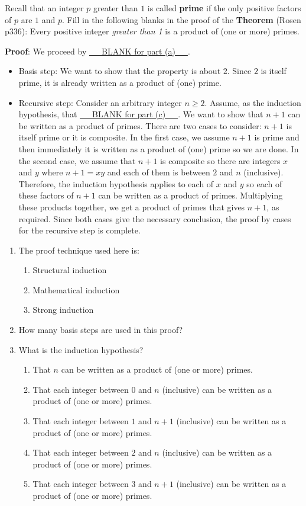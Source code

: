 
Recall that an integer $p$ greater than $1$ is called {\bf prime} if the only positive factors of 
$p$ are $1$ and $p$. Fill in the following blanks in the proof of the {\bf Theorem} (Rosen p336): 
Every positive integer {\it greater than 1} is a product of (one or more) primes.

{\bf Proof}: We proceed by \underline{~~~BLANK for part (a)~~~}.
\begin{itemize}
\item[] Basis step: We want to show that the property is about $2$. Since $2$ is itself prime,
it is already written as a product of (one) prime.
\item[] Recursive step: Consider an arbitrary integer $n \geq 2$.  Assume, as the induction hypothesis,
that \underline{~~~BLANK for part (c)~~~}. We want to show that $n+1$ can be written 
as a product of primes.  There are two cases to consider: $n+1$ is itself prime or it is composite.
In the first case, we assume $n+1$ is prime and then immediately it is written as a product
of (one) prime so we are done.  In the second case, we assume that $n+1$ is composite
so there are integers $x$ and $y$ where $n+1 = xy$ and each of them is between $2$ and $n$
(inclusive).  Therefore, the induction hypothesis applies to each of $x$ and $y$ so each 
of these factors of $n+1$ can be written as a product of primes.  Multiplying these products together, 
we get a product of primes that gives $n+1$, as required.  Since both cases give the necessary
conclusion, the proof by cases for the recursive step is complete.
\end{itemize}
\begin{enumerate}
\item  The proof technique used here is:
    \begin{enumerate}
        \item Structural induction
        \item Mathematical induction
        \item Strong induction
    \end{enumerate}
\item How many basis steps are used in this proof?
\newpage
\item What is the induction hypothesis?
\begin{enumerate}
\item That $n$ can be written as a product of (one or more) primes.
\item That each integer between $0$ and $n$ (inclusive) can be written as a product of (one or more) primes.
\item That each integer between $1$ and $n+1$ (inclusive) can be written as a product of (one or more) primes.
\item That each integer between $2$ and $n$ (inclusive) can be written as a product of (one or more) primes.
\item That each integer between $3$ and $n+1$ (inclusive) can be written as a product of (one or more) primes.
\end{enumerate}
\end{enumerate}
